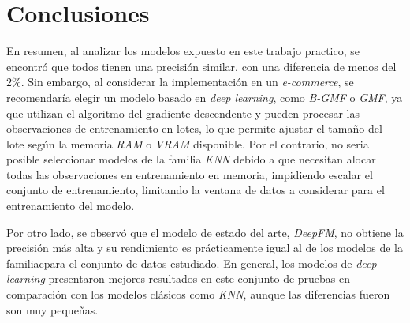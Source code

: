\documentclass[11pt,a4paper,twoside]{thesis}
\begin{document}
\chapter{Conclusiones}

En resumen, al analizar los modelos expuesto en este trabajo practico, se
encontró que todos tienen una precisión similar, con una diferencia de menos
del $2\%$. Sin embargo, al considerar la implementación en un
\textit{e-commerce}, se recomendaría elegir un modelo basado en \textit{deep
	learning}, como \textit{B-GMF} o \textit{GMF}, ya que utilizan el algoritmo del
gradiente descendente y pueden procesar las observaciones de entrenamiento en
lotes, lo que permite ajustar el tamaño del lote según la memoria \textit{RAM}
o \textit{VRAM} disponible. Por el contrario, no seria posible seleccionar
modelos de la familia \textit{KNN} debido a que necesitan alocar todas las
observaciones en entrenamiento en memoria, impidiendo escalar el conjunto de
entrenamiento, limitando la ventana de datos a considerar para el entrenamiento
del modelo.

Por otro lado, se observó que el modelo de estado del arte, \textit{DeepFM}, no
obtiene la precisión más alta y su rendimiento es prácticamente igual al de los
modelos de la familiacpara el conjunto de datos estudiado. En general, los
modelos de \textit{deep learning} presentaron mejores resultados en este
conjunto de pruebas en comparación con los modelos clásicos como \textit{KNN},
aunque las diferencias fueron son muy pequeñas.



\renewcommand{\bibname}{Referencias}
\end{document}
